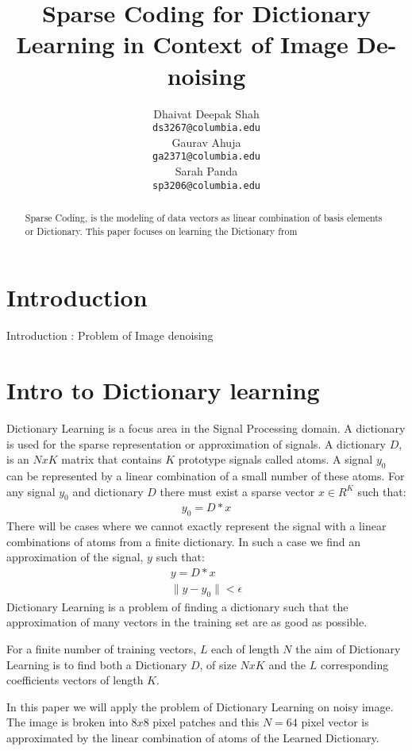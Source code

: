 \documentclass{article} %
\title{Sparse Coding for Dictionary Learning in Context of Image De-noising}
\author{
Dhaivat Deepak Shah\\
\texttt{ds3267@columbia.edu} \\
\And
Gaurav Ahuja\\
\texttt{ga2371@columbia.edu} \\
\And
Sarah Panda\\
\texttt{sp3206@columbia.edu} \\
}
\begin{document}
\maketitle


\begin{abstract}
Sparse Coding, is the modeling of data vectors as linear combination of basis elements or Dictionary. This paper focuses on learning the Dictionary from 
\end{abstract}

\vspace{-.2cm}
\section{Introduction}
\vspace{-.2cm}
Introduction : Problem of Image denoising

\section{Intro to Dictionary learning}
Dictionary Learning is a focus area in the Signal Processing domain. A dictionary is used for the sparse representation or approximation of signals. A dictionary $D$, is an $NxK$ matrix that contains $K$ prototype signals called atoms. A signal $y_0$ can be represented by a linear combination of a small number of these atoms. For any signal $y_0$ and dictionary $D$ there must exist a sparse vector $x \in R^K$ such that:
\begin{align}
y_0 = D*x
\end{align}   
There will be cases where we cannot exactly represent the signal with a linear combinations of atoms from a finite dictionary. In such a case we find an approximation of the signal, $y$ such that:
\begin{align}
y = D*x \\
\|y - y_0\| < \epsilon
\end{align} 
Dictionary Learning is a problem of finding a dictionary such that the approximation of many vectors in the training set are as good as possible. 

For a finite number of training vectors, $L$ each of length $N$ the aim of Dictionary Learning is to find both a Dictionary $D$, of size $NxK$ and the $L$ corresponding coefficients vectors of length $K$.

In this paper we will apply the problem of Dictionary Learning on noisy image. The image is broken into $8x8$ pixel patches and this $N = 64$ pixel vector is approximated by the linear combination of atoms of the Learned Dictionary.
\end{document}
